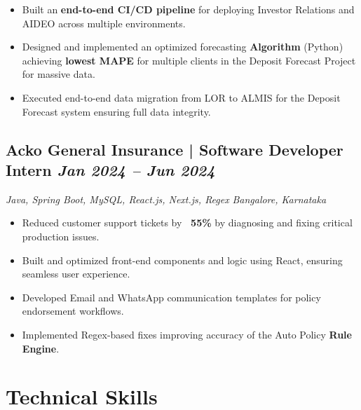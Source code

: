 \documentclass[a4paper,10pt]{article}
\newcommand{\subtext}[1]{
#1\par\vspace{-0.2cm}}
\newenvironment{zitemize}{
\begin{itemize}\itemsep0pt \parskip0pt \parsep1pt}
{\end{itemize}\vspace{-0.7cm}}
\begin{document}
\begin{zitemize}
\item Built an \textbf{end-to-end CI/CD pipeline} for deploying Investor Relations and AIDEO across multiple environments.
\item Designed and implemented an optimized forecasting \textbf{Algorithm} (Python) achieving \textbf{lowest MAPE} for multiple clients in the Deposit Forecast Project for massive data.
\item Executed end-to-end data migration from LOR to ALMIS for the Deposit Forecast system ensuring full data integrity.
\end{zitemize}
\vspace{0.1cm}

\subsection*{Acko General Insurance | Software Developer Intern \hfill {\small\textit{Jan 2024 – Jun 2024}}}
\subtext{\textit{Java, Spring Boot, MySQL, React.js, Next.js, Regex} \hfill \textit{Bangalore, Karnataka}}
\begin{zitemize}
\item Reduced customer support tickets by \textbf{~55\%} by diagnosing and fixing critical production issues.
\item Built and optimized front-end components and logic using React, ensuring seamless user experience.
\item Developed Email and WhatsApp communication templates for policy endorsement workflows.
\item Implemented Regex-based fixes improving accuracy of the Auto Policy \textbf{Rule Engine}.
\end{zitemize}
\vspace{0.0cm}



\section{Technical Skills}
\vspace{-0.1cm}
\end{document}
